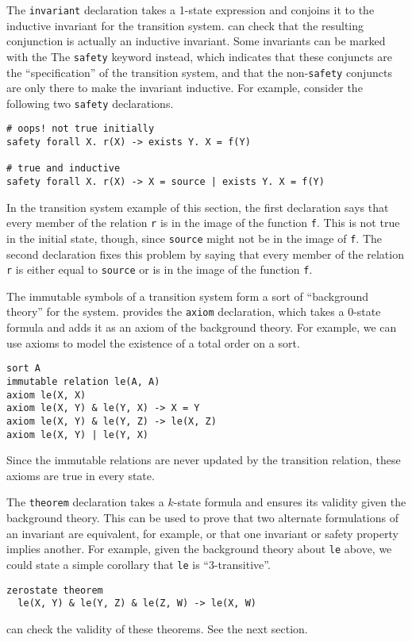 The \lstinline[language=mypyvy]{invariant} declaration takes a 1-state expression
  and conjoins it to the inductive invariant for the transition system.
\mypyvy can check that the resulting conjunction is actually an inductive invariant.
Some invariants can be marked with the The \lstinline[language=mypyvy]{safety} keyword instead,
  which indicates that these conjuncts are the ``specification'' of the transition system,
  and that the non-\lstinline[language=mypyvy]{safety} conjuncts are only there
  to make the invariant inductive.
For example, consider the following two \lstinline[language=mypyvy]{safety} declarations.
\begin{lstlisting}[language=mypyvy, xleftmargin=.2\textwidth, xrightmargin=.2\textwidth]
# oops! not true initially
safety forall X. r(X) -> exists Y. X = f(Y)

# true and inductive
safety forall X. r(X) -> X = source | exists Y. X = f(Y)
\end{lstlisting}
In the transition system example of this section,
  the first declaration says that every member of the relation \lstinline[language=mypyvy]{r}
  is in the image of the function \lstinline[language=mypyvy]{f}.
This is not true in the initial state, though,
  since \lstinline[language=mypyvy]{source} might not be in the image of \lstinline[language=mypyvy]{f}.
The second declaration fixes this problem by saying that
  every member of the relation \lstinline[language=mypyvy]{r}
  is either equal to \lstinline[language=mypyvy]{source}
  or is in the image of the function \lstinline[language=mypyvy]{f}.

The immutable symbols of a transition system form a sort of ``background theory'' for the system.
\mypyvy provides the \lstinline[language=mypyvy]{axiom} declaration,
  which takes a 0-state formula and adds it as an axiom of the background theory.
For example, we can use axioms to model the existence of a total order on a sort.
\begin{lstlisting}[language=mypyvy, xleftmargin=.2\textwidth, xrightmargin=.2\textwidth]
sort A
immutable relation le(A, A)
axiom le(X, X)
axiom le(X, Y) & le(Y, X) -> X = Y
axiom le(X, Y) & le(Y, Z) -> le(X, Z)
axiom le(X, Y) | le(Y, X)
\end{lstlisting}
Since the immutable relations are never updated by the transition relation,
  these axioms are true in every state.

The \lstinline[language=mypyvy]{theorem} declaration takes a $k$-state formula and
  ensures its validity given the background theory.
This can be used to prove that two alternate formulations of an invariant are equivalent,
  for example, or that one invariant or safety property implies another.
For example, given the background theory about \lstinline[language=mypyvy]{le} above,
  we could state a simple corollary that \lstinline[language=mypyvy]{le} is ``3-transitive''.
\begin{lstlisting}[language=mypyvy, xleftmargin=.2\textwidth, xrightmargin=.2\textwidth]
zerostate theorem
  le(X, Y) & le(Y, Z) & le(Z, W) -> le(X, W)
\end{lstlisting}
\mypyvy can check the validity of these theorems. See the next section.

